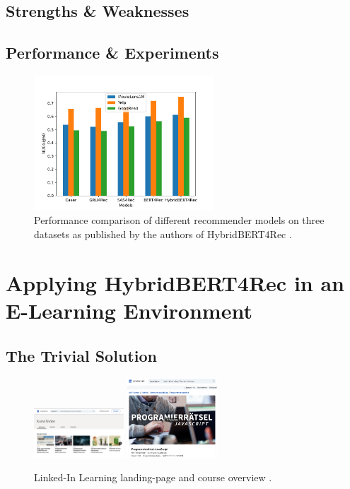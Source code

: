 \documentclass{Academic}
\begin{document}
        \subsection{Strengths \& Weaknesses}

        \subsection{Performance \& Experiments}
        \begin{figure}[ht!]
            \centering
			\includegraphics[width=0.6\textwidth]{images/results.pdf}
			\caption{Performance comparison of different recommender models on three datasets as published by the authors of HybridBERT4Rec \cite{channarongHybridBERT4RecHybridContentBased2022}.}
            \label{fig:perfExp}
		\end{figure}

    \section{Applying HybridBERT4Rec in an E-Learning Environment}

        \subsection{The Trivial Solution}
        \begin{figure}[ht!]
            \centering
			\includegraphics[width=0.3\textwidth]{images/linked_in_landing.pdf}
            \includegraphics[width=0.3\textwidth]{images/linked_in_course.pdf}
			\caption{Linked-In Learning landing-page and course overview \cite{LinkedInLearningMit}.}
            \label{fig:trivSol}
		\end{figure}
    
\end{document}
